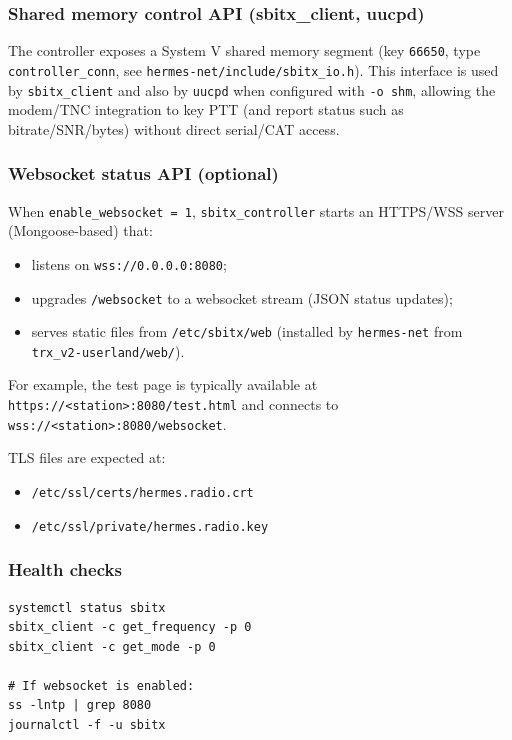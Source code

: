 \subsubsection{Shared memory control API (sbitx\_client, uucpd)}

The controller exposes a System V shared memory segment (key \verb|66650|, type \verb|controller_conn|, see
\verb|hermes-net/include/sbitx_io.h|). This interface is used by \verb|sbitx_client| and also by \verb|uucpd| when configured with
\verb|-o shm|, allowing the modem/TNC integration to key PTT (and report status such as bitrate/SNR/bytes) without direct serial/CAT
access.

\subsubsection{Websocket status API (optional)}

When \verb|enable_websocket = 1|, \verb|sbitx_controller| starts an HTTPS/WSS server (Mongoose-based) that:
\begin{itemize}
\item listens on \verb|wss://0.0.0.0:8080|;
\item upgrades \verb|/websocket| to a websocket stream (JSON status updates);
\item serves static files from \verb|/etc/sbitx/web| (installed by \verb|hermes-net| from \verb|trx_v2-userland/web/|).
\end{itemize}
For example, the test page is typically available at \verb|https://<station>:8080/test.html| and connects to
\verb|wss://<station>:8080/websocket|.

TLS files are expected at:
\begin{itemize}
\item \verb|/etc/ssl/certs/hermes.radio.crt|
\item \verb|/etc/ssl/private/hermes.radio.key|
\end{itemize}

\subsubsection{Health checks}

\begin{verbatim}
systemctl status sbitx
sbitx_client -c get_frequency -p 0
sbitx_client -c get_mode -p 0

# If websocket is enabled:
ss -lntp | grep 8080
journalctl -f -u sbitx
\end{verbatim}

